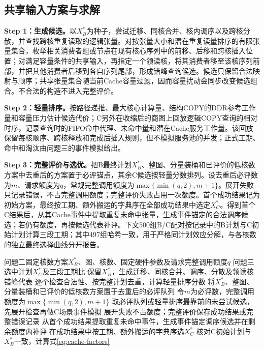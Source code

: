 \subsection{共享输入方案与求解}
\textbf{Step 1：生成候选。}以$X_B^*$为种子，尝试迁移、同核合并、核内调序以及跨核分散，并查找跨核重复读取的逻辑张量。对按张量大小和潜在重复读量排序的有限张量集合，枚举相关消费者组或节点在现有核心序列中的前移、后移和跨核插入位置；对满足容量条件的共享输入，再指定一个领读核，将其消费者移至该核序列前部，并把其他消费者后移到各自序列尾部，形成错峰查询候选。候选只保留合法映射与顺序；共享张量集合随当前Cache容量过滤，因而容量扰动会同步改变候选组合。不合法的构造不进入完整评价。

\textbf{Step 2：轻量排序。}按路径递推、最大核心计算量、结构COPY的DDR参考工作量和容量压力估计候选代价；C另外在收缩后的商图上回放逻辑COPY查询的相对时序，记录查询时的FIFO命中代理、未命中量和潜在Cache服务工作量。该回放保留每核顺序、跨核释放和完成后插入规则，但不模拟服务池的并发；正式工期、命中和淘汰由问题三的事件模拟给出。

\textbf{Step 3：完整评价与选优。}把B最终计划$X_B^*$、整图、分量装桶和已评价的低核数方案中去重后的方案置于必评锚点，其余C候选按轻量分数排列。设去重后必评数为$m$、请求额度为$q$，常规完整调用额度为$\max\{\min(q,2),m+1\}$。展开失败只记录错误，不占完整调用额度；完整评价失败占用一次额度。首个成功结果记为初始方案，最终按工期、额外搬运的字典序在全部成功结果中选定$X_C^*$。得到首个C结果后，从其Cache事件中提取重复未命中张量，生成事件锚定的合法调序候选；若仍有额度，再按候选代表补评。下文500组B/C配对按记录中的B计划与C初始计划计算三段工期；其中497组哈希一致，用于严格同计划效应分解，与各核数的独立最终选择曲线分开报告。

\begin{algorithm}[H]\caption{问题三候选选择与同计划对照}\label{alg:c-select}
\begin{algorithmic}[1]
\REQUIRE 问题二固定核数方案$X_B^*$、图、核数、固定硬件参数及请求完整调用额度$q$
\ENSURE 问题三选中计划$X_C^*$及三段工期比
\STATE 保留$X_B^*$，生成迁移、同核合并、调序、分散及领读核错峰代表
\STATE 逐个检查合法性、按完整计划去重，计算轻量排序分数
\STATE 将$X_B^*$、整图、分量装桶和已评价的低核数方案置于去重后的必评队列
\STATE 令$m$为必评数，完整调用额度为$\max\{\min(q,2),m+1\}$
\STATE 取必评队列或轻量排序最靠前的未尝试候选，先展开检查再做C场景事件模拟
\STATE 展开失败不占额度；完整评价保存成功结果或完整错误记录
\ENDWHILE
\STATE 从首个成功结果提取重复未命中事件，生成事件锚定调序候选并在剩余额度内补评
\STATE 在成功结果中按工期、额外搬运的字典序选$X_C^*$
\STATE 核对C初始计划与$X_B^*$一致，计算式\eqref{eq:cache-factors}
\end{algorithmic}\end{algorithm}

